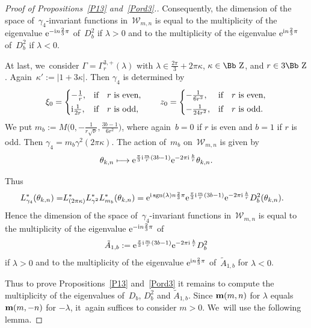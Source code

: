 \documentclass[pdftex]{sigma}
\newcommand\ZZ{{\mbox{\Bb Z}}}
\newcommand\bm{\textbf{{\rm \textbf{m}}}}
\newcommand{\sgn}{\mathop{{\rm sgn}}}
\numberwithin{equation}{section}
\begin{document}
\begin{proof}[Proof of Propositions~\ref{P13} and~\ref{Pord3}.]
Consequently, the dimension of the space of~$\gamma_4$-invariant functions in~${\mathcal W}_{m,n}$ is equal to the multiplicity of the eigenvalue ${\rm e}^{-{\rm i}n\frac{2}{3}\pi}$ of~$D_b^2$ if $\lambda>0$ and to the multiplicity of the eigenvalue ${\rm e}^{{\rm i}n\frac{2}{3}\pi}$ of~$D^2_b$ if $\lambda<0$.

At last, we~consider $\Gamma=\Gamma^{3,+}_r(\lambda)$ with $\lambda \in \frac{2\pi} 3+2\pi\kappa$, $\kappa\in\ZZ$, and $r\in3\ZZ$. Again~$\kappa':=|1+3\kappa|$.
Then $\gamma_4$ is determined by
\begin{gather*}
\xi_0=\begin{cases}
-\frac{1}{r},&\text{if\quad $r$ is even},
\\[.5ex]
{\rm i}\frac{1}{2r},&\text{if\quad $r$ is odd},
\end{cases}\qquad
z_0=\begin{cases}
-\frac{1}{6r^2},&\text{if\quad $r$ is even},
\\[.5ex]
-\frac{1}{24r^2},&\text{if\quad $r$ is odd}.
\end{cases}
\end{gather*}
We put $m_b:=M\big(0,-\frac{1}{r\sqrt\nu},\frac{3b-1}{6r^2}\big)$, where again~$b=0$ if $r$ is even and $b=1$ if $r$ is odd. Then $\gamma_4=m_b\gamma^2(2\pi\kappa)$.
The action of~$m_b$ on~${\mathcal W}_{m,n}$ is given by
\begin{gather*}
\theta_{k,n}\longmapsto {\rm e}^{\frac{\pi}{3}{\rm i}\frac{m}{r}(3b-1)}{\rm e}^{-2\pi {\rm i}\,\frac{k}{r}}\theta_{k,n}.
\end{gather*}

Thus
\begin{align*}
L_{\gamma_{4}}^*(\theta_{k,n})=&L^*_{(2\pi\kappa)}L^*_{\gamma^2}L^*_{m_b}(\theta_{k,n})={\rm e}^{{\rm i}\sgn(\lambda)n\frac{2}{3}\pi}{\rm e}^{\frac{\pi}{3}{\rm i}\frac{m}{r}(3b-1)}{\rm e}^{-2\pi {\rm i}\,\frac{k}{r}}D^2_b(\theta_{k,n}).
\end{align*}
Hence the dimension of the space of~$\gamma_4$-invariant functions in~${\mathcal W}_{m,n}$ is equal to the multiplicity of the eigenvalue ${\rm e}^{-{\rm i}n\frac{2}{3}\pi}$ of
\begin{gather*}
\tilde A_{1,b}:={\rm e}^{\frac{\pi}{3}{\rm i}\frac{m}{r}(3b-1)}{\rm e}^{-2\pi {\rm i}\,\frac{k}{r}}D^2_b
\end{gather*}
if $\lambda>0$ and to the multiplicity of the eigenvalue ${\rm e}^{{\rm i}n\frac{2}{3}\pi}$ of~$\tilde A_{1,b}$ for $\lambda<0$.

Thus to prove Propositions~\ref{P13} and~\ref{Pord3} it remains to compute the multiplicity of the eigenvalues of~$D_b$, $D^2_b$ and $\tilde A_{1,b}$. Since $\bm(m,n)$ for $\lambda$ equals $\bm(m,-n)$ for $-\lambda$, it~again suffices to consider $m>0$. We~will use the following lemma.


\end{proof}
\end{document}
